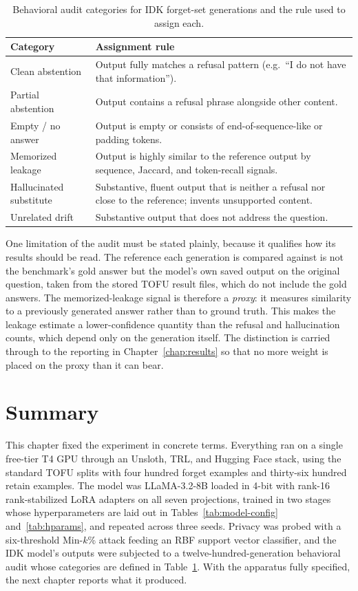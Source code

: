 \documentclass[a4paper,12pt]{report}
\begin{document}
\begin{table}[htbp]
	\centering
	\caption{Behavioral audit categories for IDK forget-set generations and the rule used to assign each.}
	\label{tab:audit-categories}
	\begin{tabular}{p{3.6cm} p{9.0cm}}
		\toprule
		\textbf{Category} & \textbf{Assignment rule} \\
		\midrule
		Clean abstention & Output fully matches a refusal pattern (e.g.\ ``I do not have that information''). \\
		Partial abstention & Output contains a refusal phrase alongside other content. \\
		Empty / no answer & Output is empty or consists of end-of-sequence-like or padding tokens. \\
		Memorized leakage & Output is highly similar to the reference output by sequence, Jaccard, and token-recall signals. \\
		Hallucinated substitute & Substantive, fluent output that is neither a refusal nor close to the reference; invents unsupported content. \\
		Unrelated drift & Substantive output that does not address the question. \\
		\bottomrule
	\end{tabular}
\end{table}

One limitation of the audit must be stated plainly, because it qualifies how its results should be read. The reference each generation is compared against is not the benchmark's gold answer but the model's own saved output on the original question, taken from the stored TOFU result files, which do not include the gold answers. The memorized-leakage signal is therefore a \emph{proxy}: it measures similarity to a previously generated answer rather than to ground truth. This makes the leakage estimate a lower-confidence quantity than the refusal and hallucination counts, which depend only on the generation itself. The distinction is carried through to the reporting in Chapter~\ref{chap:results} so that no more weight is placed on the proxy than it can bear.

\section{Summary}
This chapter fixed the experiment in concrete terms. Everything ran on a single free-tier T4 GPU through an Unsloth, TRL, and Hugging Face stack, using the standard TOFU splits with four hundred forget examples and thirty-six hundred retain examples. The model was LLaMA-3.2-8B loaded in 4-bit with rank-16 rank-stabilized LoRA adapters on all seven projections, trained in two stages whose hyperparameters are laid out in Tables~\ref{tab:model-config} and~\ref{tab:hparams}, and repeated across three seeds. Privacy was probed with a six-threshold Min-$k$\% attack feeding an RBF support vector classifier, and the IDK model's outputs were subjected to a twelve-hundred-generation behavioral audit whose categories are defined in Table~\ref{tab:audit-categories}. With the apparatus fully specified, the next chapter reports what it produced.
\end{document}
